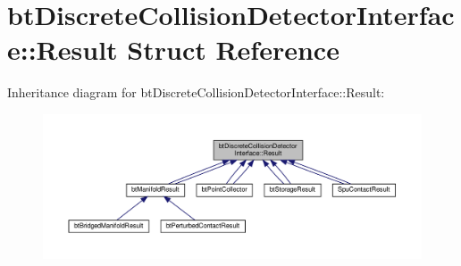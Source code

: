\hypertarget{structbtDiscreteCollisionDetectorInterface_1_1Result}{}\section{bt\+Discrete\+Collision\+Detector\+Interface\+:\+:Result Struct Reference}
\label{structbtDiscreteCollisionDetectorInterface_1_1Result}


Inheritance diagram for bt\+Discrete\+Collision\+Detector\+Interface\+:\+:Result\+:
\nopagebreak
\begin{figure}[H]
\begin{center}
\leavevmode
\includegraphics[width=350pt]{structbtDiscreteCollisionDetectorInterface_1_1Result__inherit__graph}
\end{center}
\end{figure}
